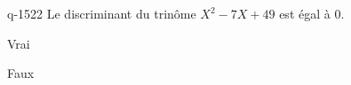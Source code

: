 \begin{truefalse}{q-1522}
Le discriminant du trinôme $X^2-7X+49$ est égal à $0$.
\item Vrai
\item* Faux
\end{truefalse}

